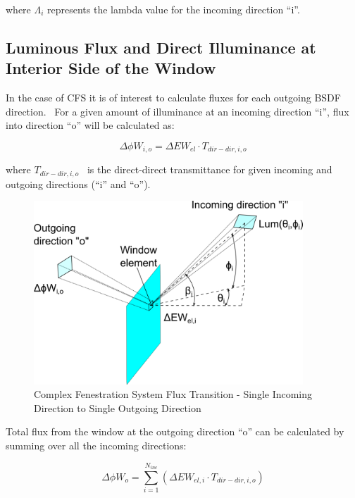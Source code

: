 where \({\Lambda_i}\) represents the lambda value for the incoming direction ``i''.

\subsection{Luminous Flux and Direct Illuminance at Interior Side of the Window}\label{luminous-flux-and-direct-illuminance-at-interior-side-of-the-window}

In the case of CFS it is of interest to calculate fluxes for each outgoing BSDF direction.~ For a given amount of illuminance at an incoming direction ``i'', flux into direction ``o'' will be calculated as:

\begin{equation}
\Delta \phi {W_{i,o}} = \Delta E{W_{el}} \cdot {T_{dir - dir,i,o}}
\end{equation}

where \({T_{dir - dir,i,o}}\) ~is the direct-direct transmittance for given incoming and outgoing directions (``i'' and ``o'').

\begin{figure}[hbtp] %
\centering
\includegraphics[width=0.9\textwidth, height=0.9\textheight, keepaspectratio=true]{media/image854.png}
\caption{Complex Fenestration System Flux Transition - Single Incoming Direction to Single Outgoing Direction \protect \label{fig:complex-fenestration-system-flux-transition}}
\end{figure}

Total flux from the window at the outgoing direction ``o'' can be calculated by summing over all the incoming directions:

\begin{equation}
\Delta \phi {W_o} = \sum\limits_{i = 1}^{{N_{inc}}} {(\Delta E{W_{el,i}} \cdot {T_{dir - dir,i,o}})}
\end{equation}

